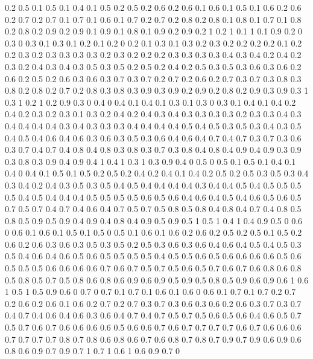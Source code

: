 0.2 0.5
0.1 0.5
0.1 0.4
0.1 0.5
0.2 0.5
0.2 0.6
0.2 0.6
0.1 0.6
0.1 0.5
0.1 0.6
0.2 0.6
0.2 0.7
0.2 0.7
0.1 0.7
0.1 0.6
0.1 0.7
0.2 0.7
0.2 0.8
0.2 0.8
0.1 0.8
0.1 0.7
0.1 0.8
0.2 0.8
0.2 0.9
0.2 0.9
0.1 0.9
0.1 0.8
0.1 0.9
0.2 0.9
0.2 1
0.2 1
0.1 1
0.1 0.9
0.2 0
0.3 0
0.3 0.1
0.3 0.1
0.2 0.1
0.2 0
0.2 0.1
0.3 0.1
0.3 0.2
0.3 0.2
0.2 0.2
0.2 0.1
0.2 0.2
0.3 0.2
0.3 0.3
0.3 0.3
0.2 0.3
0.2 0.2
0.2 0.3
0.3 0.3
0.3 0.4
0.3 0.4
0.2 0.4
0.2 0.3
0.2 0.4
0.3 0.4
0.3 0.5
0.3 0.5
0.2 0.5
0.2 0.4
0.2 0.5
0.3 0.5
0.3 0.6
0.3 0.6
0.2 0.6
0.2 0.5
0.2 0.6
0.3 0.6
0.3 0.7
0.3 0.7
0.2 0.7
0.2 0.6
0.2 0.7
0.3 0.7
0.3 0.8
0.3 0.8
0.2 0.8
0.2 0.7
0.2 0.8
0.3 0.8
0.3 0.9
0.3 0.9
0.2 0.9
0.2 0.8
0.2 0.9
0.3 0.9
0.3 1
0.3 1
0.2 1
0.2 0.9
0.3 0
0.4 0
0.4 0.1
0.4 0.1
0.3 0.1
0.3 0
0.3 0.1
0.4 0.1
0.4 0.2
0.4 0.2
0.3 0.2
0.3 0.1
0.3 0.2
0.4 0.2
0.4 0.3
0.4 0.3
0.3 0.3
0.3 0.2
0.3 0.3
0.4 0.3
0.4 0.4
0.4 0.4
0.3 0.4
0.3 0.3
0.3 0.4
0.4 0.4
0.4 0.5
0.4 0.5
0.3 0.5
0.3 0.4
0.3 0.5
0.4 0.5
0.4 0.6
0.4 0.6
0.3 0.6
0.3 0.5
0.3 0.6
0.4 0.6
0.4 0.7
0.4 0.7
0.3 0.7
0.3 0.6
0.3 0.7
0.4 0.7
0.4 0.8
0.4 0.8
0.3 0.8
0.3 0.7
0.3 0.8
0.4 0.8
0.4 0.9
0.4 0.9
0.3 0.9
0.3 0.8
0.3 0.9
0.4 0.9
0.4 1
0.4 1
0.3 1
0.3 0.9
0.4 0
0.5 0
0.5 0.1
0.5 0.1
0.4 0.1
0.4 0
0.4 0.1
0.5 0.1
0.5 0.2
0.5 0.2
0.4 0.2
0.4 0.1
0.4 0.2
0.5 0.2
0.5 0.3
0.5 0.3
0.4 0.3
0.4 0.2
0.4 0.3
0.5 0.3
0.5 0.4
0.5 0.4
0.4 0.4
0.4 0.3
0.4 0.4
0.5 0.4
0.5 0.5
0.5 0.5
0.4 0.5
0.4 0.4
0.4 0.5
0.5 0.5
0.5 0.6
0.5 0.6
0.4 0.6
0.4 0.5
0.4 0.6
0.5 0.6
0.5 0.7
0.5 0.7
0.4 0.7
0.4 0.6
0.4 0.7
0.5 0.7
0.5 0.8
0.5 0.8
0.4 0.8
0.4 0.7
0.4 0.8
0.5 0.8
0.5 0.9
0.5 0.9
0.4 0.9
0.4 0.8
0.4 0.9
0.5 0.9
0.5 1
0.5 1
0.4 1
0.4 0.9
0.5 0
0.6 0
0.6 0.1
0.6 0.1
0.5 0.1
0.5 0
0.5 0.1
0.6 0.1
0.6 0.2
0.6 0.2
0.5 0.2
0.5 0.1
0.5 0.2
0.6 0.2
0.6 0.3
0.6 0.3
0.5 0.3
0.5 0.2
0.5 0.3
0.6 0.3
0.6 0.4
0.6 0.4
0.5 0.4
0.5 0.3
0.5 0.4
0.6 0.4
0.6 0.5
0.6 0.5
0.5 0.5
0.5 0.4
0.5 0.5
0.6 0.5
0.6 0.6
0.6 0.6
0.5 0.6
0.5 0.5
0.5 0.6
0.6 0.6
0.6 0.7
0.6 0.7
0.5 0.7
0.5 0.6
0.5 0.7
0.6 0.7
0.6 0.8
0.6 0.8
0.5 0.8
0.5 0.7
0.5 0.8
0.6 0.8
0.6 0.9
0.6 0.9
0.5 0.9
0.5 0.8
0.5 0.9
0.6 0.9
0.6 1
0.6 1
0.5 1
0.5 0.9
0.6 0
0.7 0
0.7 0.1
0.7 0.1
0.6 0.1
0.6 0
0.6 0.1
0.7 0.1
0.7 0.2
0.7 0.2
0.6 0.2
0.6 0.1
0.6 0.2
0.7 0.2
0.7 0.3
0.7 0.3
0.6 0.3
0.6 0.2
0.6 0.3
0.7 0.3
0.7 0.4
0.7 0.4
0.6 0.4
0.6 0.3
0.6 0.4
0.7 0.4
0.7 0.5
0.7 0.5
0.6 0.5
0.6 0.4
0.6 0.5
0.7 0.5
0.7 0.6
0.7 0.6
0.6 0.6
0.6 0.5
0.6 0.6
0.7 0.6
0.7 0.7
0.7 0.7
0.6 0.7
0.6 0.6
0.6 0.7
0.7 0.7
0.7 0.8
0.7 0.8
0.6 0.8
0.6 0.7
0.6 0.8
0.7 0.8
0.7 0.9
0.7 0.9
0.6 0.9
0.6 0.8
0.6 0.9
0.7 0.9
0.7 1
0.7 1
0.6 1
0.6 0.9
0.7 0

